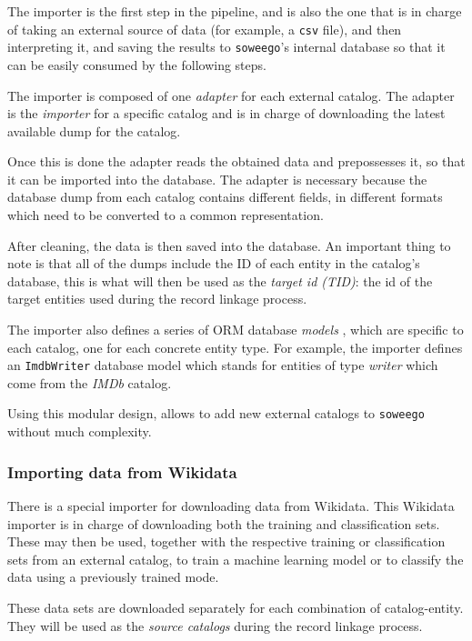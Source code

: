 \documentclass[epsfig,a4paper,11pt,titlepage,twoside,openany]{book}
\begin{document}
The importer is the first step in the pipeline, and is also the one that is in charge of taking an external source of data (for example, a \texttt{csv} file), and then interpreting it, and saving the results to \texttt{soweego}'s internal database so that it can be easily consumed by the following steps.

The importer is composed of one \textit{adapter} for each external catalog. The adapter is the \textit{importer} for a specific catalog and is in charge of downloading the latest available dump for the catalog. 


Once this is done the adapter reads the obtained data and prepossesses it, so that it can be imported into the database. The adapter is necessary because the database dump from each catalog contains different fields, in different formats which need to be converted to a common representation. 


After cleaning, the data is then saved into the database. An important thing to note is that all of the dumps include the ID of each entity in the catalog's database, this is what will then be used as the \textit{target id (TID)}: the id of the target entities used during the  record linkage process.

The importer also defines a series of ORM database \textit{models} \cite{sqlalchemy}, which are specific to each catalog, one for each concrete entity type. For example, the importer defines an \texttt{ImdbWriter} database model which stands for entities of type \textit{writer} which come from the \textit{IMDb} catalog.

Using this modular design, allows to add new external catalogs to \texttt{soweego} without much complexity.


\subsubsection{Importing data from Wikidata}
\label{sec:importing-from-wikidata}

There is a special importer for downloading data from Wikidata. This Wikidata importer is in charge of downloading both the training and classification sets. These may then be used, together with the respective training or classification sets from an external catalog, to train a machine learning model or to classify the data using a previously trained mode.

These data sets are downloaded separately for each combination of catalog-entity. They will be used as the \textit{source catalogs} during the record linkage process.
\end{document}
